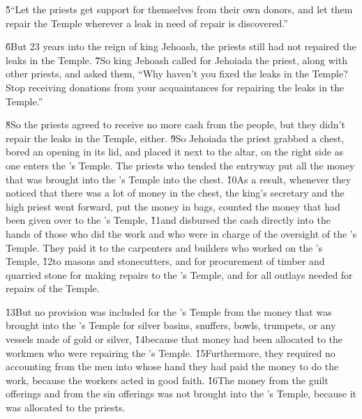 \begin{poetry}
\poeml \v{5}``Let the priests get support for themselves from their own donors, and let them repair the Temple wherever a leak in need of repair is discovered.''
\end{poetry}

\v{6}But 23 years into the reign of king Jehoash, the priests still had not repaired the leaks in the Temple. \v{7}So king Jehoash called for Jehoiada the priest, along with other priests, and asked them, ``Why haven't you fixed the leaks in the Temple? Stop receiving donations from your acquaintances for repairing the leaks in the Temple.''

\v{8}So the priests agreed to receive no more cash from the people, but they didn't repair the leaks in the Temple, either. \v{9}So Jehoiada the priest grabbed a chest, bored an opening in its lid, and placed it next to the altar, on the right side as one enters the 's Temple. The priests who tended the entryway put all the money that was brought into the 's Temple into the chest. \v{10}As a result, whenever they noticed that there was a lot of money in the chest, the king's secretary and the high priest went forward, put the money in bags, counted the money that had been given over to the 's Temple, \v{11}and disbursed the cash directly into the hands of those who did the work and who were in charge of the oversight of the 's Temple. They paid it to the carpenters and builders who worked on the 's Temple, \v{12}to masons and stonecutters, and for procurement of timber and quarried stone for making repairs to the 's Temple, and for all outlays needed for repairs of the Temple.

\v{13}But no provision was included for the 's Temple from the money that was brought into the 's Temple for silver basins, snuffers, bowls, trumpets, or any vessels made of gold or silver, \v{14}because that money had been allocated to the workmen who were repairing the 's Temple. \v{15}Furthermore, they required no accounting from the men into whose hand they had paid the money to do the work, because the workers acted in good faith. \v{16}The money from the guilt offerings and from the sin offerings was not brought into the 's Temple, because it was allocated to the priests.

